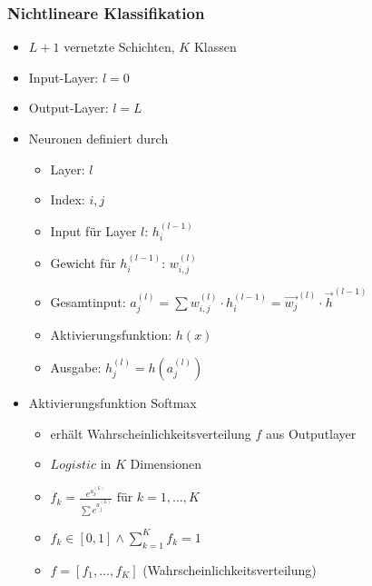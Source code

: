 \documentclass[nonacm=true, language=german]{acmart}
\begin{document}
\subsubsection{Nichtlineare Klassifikation}

\begin{itemize}
    \item $L+1$ vernetzte Schichten, $K$ Klassen
    \item Input-Layer: $l=0$
    \item Output-Layer: $l=L$
    \item Neuronen definiert durch
    \begin{itemize}
        \item Layer: $l$
        \item Index: $i, j$
        \item Input für Layer $l$: $h_i^{(l-1)}$
        \item Gewicht für $h_i^{(l-1)}$: $w_{i,j}^{(l)}$
        \item Gesamtinput: $ a_j^{(l)} = \sum w_{i,j}^{(l)} \cdot h_i^{(l-1)} = \Vec{w_j}^{(l)} \cdot \Vec{h}^{(l-1)} $
        \item Aktivierungsfunktion: $h(x)$
        \item Ausgabe: $h_j^{(l)} = h(a_j^{(l)})$
    \end{itemize}
    
    \item Aktivierungsfunktion Softmax
    \begin{itemize}
        \item erhält Wahrscheinlichkeitsverteilung $f$ aus Outputlayer
        \item $Logistic$ in $K$ Dimensionen
        \item $ f_k = \frac{e^{a_k^{(L)}}}{\sum e^{a_j^{(L)}}} \text{ für } k = 1, \dots, K $
        \item $ \displaystyle f_k \in [0, 1] \wedge \sum_{k=1}^K f_k = 1 $
        \item $ f = [f_1, \dots, f_K] $ (Wahrscheinlichkeitsverteilung)
    \end{itemize}
    

\end{itemize}
\end{document}
